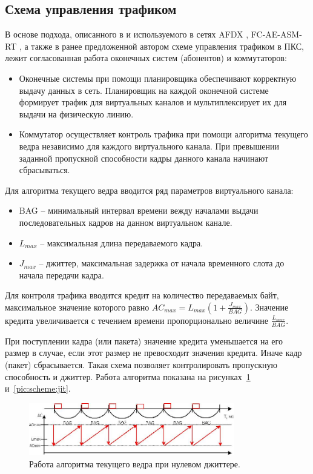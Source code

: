 \documentclass[12pt, a4paper]{article}
\begin{document}
\subsection{Схема управления трафиком}
В основе подхода, описанного в \cite{vdovin} и используемого в сетях AFDX \cite{afdx}, FC-AE-ASM-RT \cite{fcaert}, а также в ранее предложенной автором схеме управления трафиком в  ПКС, лежит согласованная работа оконечных систем (абонентов) и коммутаторов:
\begin{itemize}
	\item Оконечные системы при помощи планировщика обеспечивают корректную выдачу данных в сеть. Планировщик на каждой оконечной системе формирует трафик для виртуальных каналов и мультиплексирует их для выдачи на физическую линию.
	\item Коммутатор осуществляет контроль трафика при помощи алгоритма текущего ведра независимо для каждого виртуального канала. При превышении заданной пропускной способности кадры данного канала начинают сбрасываться.
\end{itemize}


Для алгоритма текущего ведра вводится ряд параметров виртуального канала:
\begin{itemize}
	\item BAG -- минимальный интервал времени вежду началами выдачи последовательных кадров на данном виртуальном канале.
	\item $L_{max}$ -- максимальная длина передаваемого кадра.
	\item $J_{max}$ -- джиттер, максимальная задержка от начала временного слота до начала передачи кадра.
\end{itemize}

Для контроля трафика вводится кредит на количество передаваемых байт, максимальное значение которого равно $AC_{max} = L_{max}(1 + \frac{J_{max}}{BAG})$. Значение
кредита увеличивается с течением времени пропорционально величине $\frac{L_{max}}{BAG}$.

При поступлении кадра (или пакета) значение кредита уменьшается на его размер в случае, если этот размер не превосходит значения кредита. Иначе кадр (пакет) сбрасывается. Такая схема позволяет контролировать пропускную способность и джиттер. Работа алгоритма показана на рисунках~\ref{pic:scheme:nojit} и~\ref{pic:scheme:jit}.

\begin{figure}[h!]
	\centering
	\includegraphics[width=0.80\textwidth]{img/nojit.png}
	\caption[russian]{Работа алгоритма текущего ведра при нулевом джиттере.}
	\label{pic:scheme:nojit}
\end{figure}
\end{document}
